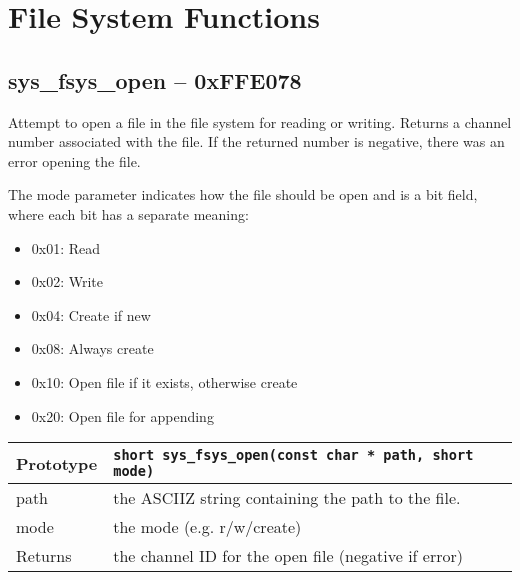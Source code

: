 \section{File System Functions}



\subsection*{sys\_fsys\_open -- 0xFFE078}
Attempt to open a file in the file system for reading or writing.
Returns a channel number associated with the file.
If the returned number is negative, there was an error opening the file.

The mode parameter indicates how the file should be open and is a bit field, where each bit has a separate meaning:
\begin{itemize}
    \item 0x01: Read
    \item 0x02: Write
    \item 0x04: Create if new
    \item 0x08: Always create
    \item 0x10: Open file if it exists, otherwise create
    \item 0x20: Open file for appending
\end{itemize}

\bigskip		

\begin{tabular}{|l||l|} \hline
Prototype & \lstinline!short sys_fsys_open(const char * path, short mode)! \\ \hline
path & the ASCIIZ string containing the path to the file. \\ \hline
mode & the mode (e.g. r/w/create) \\ \hline
Returns & the channel ID for the open file (negative if error) \\ \hline
\end{tabular}

